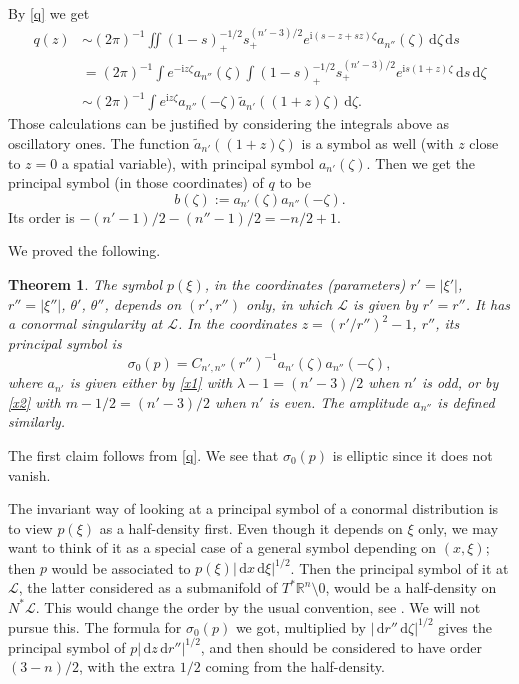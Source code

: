 \documentclass[11pt]{amsart}
\newtheorem{theorem}{Theorem}[section]
\theoremstyle{definition}
\theoremstyle{remark}
\numberwithin{equation}{section}
\newcommand{\rb}{\mathbb{R}}
\renewcommand{\d}{\,\mathrm{d}}
\newcommand{\I}{\mathrm{i}}
\begin{document}
By \eqref{q} we get 
\begin{align}
 q(z)& \sim  (2\pi)^{-1} \iint (1-s)_+^{-1/2} s_+^{(n'-3)/2}  e^{\I (s-z +sz)\zeta} a_{n''}(\zeta)\d \zeta   \d s \\
 &=  (2\pi)^{-1}  \int e^{-\I z\zeta}a_{n''}(\zeta) \int (1-s)_+^{-1/2} s_+^{(n'-3)/2}  e^{\I s(1 +z)\zeta} \d s \d \zeta   \\
  &\sim  (2\pi)^{-1}  \int e^{\I z\zeta} a_{n''}(-\zeta) \tilde a_{n'}((1+z)\zeta) \d \zeta .  \label{qz}
\end{align}
Those calculations can be justified by considering the integrals above as oscillatory ones. 
The function $\tilde a_{n'}((1+z)\zeta)$ is a symbol as well (with $z$ close to $z=0$ a spatial variable), with principal symbol  $ a_{n'}(\zeta)$. Then we get the principal symbol (in those coordinates) of $q$ to be
\begin{equation}\label{b}
b(\zeta):=   a_{n'}(\zeta) a_{n''}(-\zeta).
\end{equation}
Its order is $-(n'-1)/2 -(n''-1)/2 = -n/2+1$. 

We proved the following. 
\begin{theorem} \label{thm_co}
The symbol $p(\xi)$, in the coordinates (parameters) $r'=|\xi'|$, $r''=|\xi''|$, $\theta'$, $\theta''$,  depends on $(r',r'')$ only, in which $\mathcal L$ is given by $r'=r''$. It has a conormal singularity at $\mathcal L$. 
 In the coordinates $z= (r'/r'')^2-1$, $r''$, 
its  principal symbol is 
\[
\sigma_0(p)= C_{n',n''}(r'')^{-1}  a_{n'}(\zeta) a_{n''}(-\zeta),
\]
where $a_{n'}$ is given either by \eqref{x1} with $\lambda -1 = (n'-3)/2$ when $n'$ is odd, or by \eqref{x2} with $m-1/2=(n'-3)/2$ when $n'$ is even.   The amplitude $a_{n''}$ is defined similarly. 
\end{theorem}

The first claim follows from \eqref{q}.   We see that $\sigma_0(p)$ is elliptic since it does not vanish.   

The invariant way of looking at a principal symbol of a conormal distribution is to view $p(\xi)$ as a half-density first. Even though it depends on $\xi$ only, we may want to think of it as a special case of a general symbol depending on $(x,\xi)$; then $p$ would be associated to $p(\xi)|\!\d x\d\xi|^{1/2}$. Then the principal symbol of it at $\mathcal{L}$, the latter considered as a submanifold of $T^*\rb^n\setminus 0$, would be a half-density on $N^*\mathcal{L}$. This would change the order by the usual convention, see \cite[XVIII.18.2]{Hormander3}. We will not pursue this. The formula for $\sigma_0(p)$ we got, multiplied by $|\!\d r''\d \zeta|^{1/2}$ gives the principal symbol of $p|\!\d z\d r''|^{1/2}$, and then should be considered to have  order $(3-n)/2$, with the extra $1/2$ coming from the half-density. 
\end{document}
